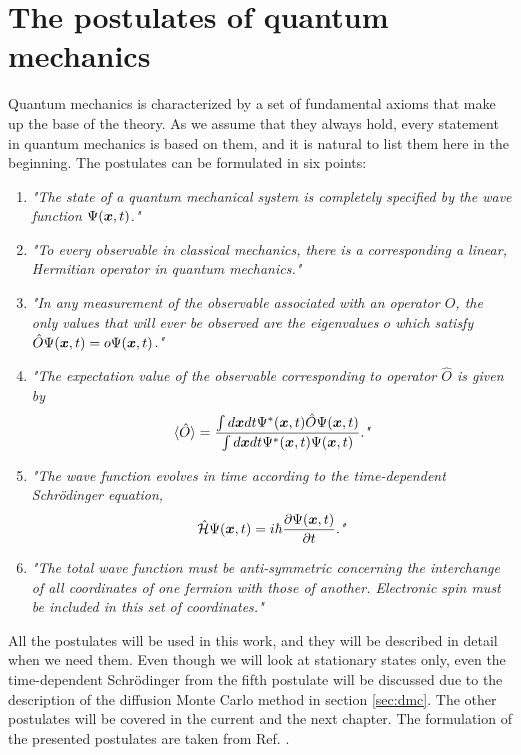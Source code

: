 \section{The postulates of quantum mechanics} \label{sec:postulates}
Quantum mechanics is characterized by a set of fundamental axioms that make up the base of the theory. As we assume that they always hold, every statement in quantum mechanics is based on them, and it is natural to list them here in the beginning. The postulates can be formulated in six points:

\begin{enumerate}
	\item \textit{"The state of a quantum mechanical system is completely specified by the wave function $\Psi(\boldsymbol{{x}},t)$."}
	
	\item \textit{"To every observable in classical mechanics, there is a corresponding a linear, Hermitian operator in quantum mechanics."}
	
	\item \textit{"In any measurement of the observable associated with an operator $\hat{O}$, the only values that will ever be observed are the eigenvalues $o$ which satisfy $\hat{O}\Psi(\boldsymbol{{x}},t)=o\Psi(\boldsymbol{{x}},t)$."}
	
	\item \textit{"The expectation value of the observable corresponding to operator $\hat{O}$ is given by
		$$\langle\hat{O}\rangle=\frac{\int d\boldsymbol{{x}}dt\Psi^*(\boldsymbol{{x}},t)\hat{O}\Psi(\boldsymbol{{x}},t)}{\int d\boldsymbol{{x}}dt\Psi^*(\boldsymbol{{x}},t)\Psi(\boldsymbol{{x}},t)}.\textit{"}$$}
	
	\item \textit{"The wave function evolves in time according to the time-dependent Schrödinger equation,
		$$\hat{\mathcal{H}}\Psi(\boldsymbol{{x}},t)=i\hbar\frac{\partial\Psi(\boldsymbol{{x}},t)}{\partial t}.\textit{"}$$}
	
	\item \textit{"The total wave function must be anti-symmetric concerning the interchange of all coordinates of one fermion with those of another. Electronic spin must be included in this set of coordinates."} 
\end{enumerate}
All the postulates will be used in this work, and they will be described in detail when we need them. Even though we will look at stationary states only, even the time-dependent Schrödinger from the fifth postulate will be discussed due to the description of the diffusion Monte Carlo method in section \ref{sec:dmc}. The other postulates will be covered in the current and the next chapter. The formulation of the presented postulates are taken from Ref. \cite{sherrill_david_postulates_2003}.

